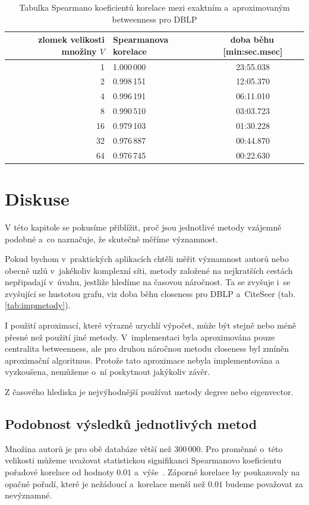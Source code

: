 \documentclass{bakalarka}
\begin{document}
\begin{table}[!ht]
\centering
\caption{Tabulka Spearmano koeficientů korelace mezi exaktním a~aproximovaným betweenness pro DBLP}
\label{tab:btwA}
\begin{tabular}{r|l|c}
\toprule
zlomek velikosti množiny $V$ & Spearmanova korelace & doba běhu\,[min:sec.msec] \\
\midrule
1  & 1.000\,000 & 23:55.038\\
2  & 0.998\,151 & 12:05.370\\
4  & 0.996\,191 & 06:11.010\\
8  & 0.990\,510 & 03:03.723\\
16 & 0.979\,103 & 01:30.228\\
32 & 0.976\,887 & 00:44.870\\
64 & 0.976\,745 & 00:22.630\\
\bottomrule
\end{tabular}
\end{table}

\chapter{Diskuse}
V této kapitole se pokusíme přiblížit, proč jsou jednotlivé metody vzájemně podobné a~co naznačuje, že skutečně měříme významnost.

Pokud bychom v~praktických aplikacích chtěli měřit významnost autorů nebo
obecně uzlů v~jakékoliv komplexní síti, metody založené na nejkratších cestách
nepřipadají v~úvahu, jestliže hledíme na časovou náročnost. Ta se zvyšuje i~se
zvyšující se hustotou grafu, viz doba běhu closeness pro DBLP a~CiteSeer (tab.
\ref{tab:impmetody}).

I použití aproximací, které výrazně urychlí výpočet, může být stejně nebo méně
přesné než použití jiné metody. V~implementaci byla aproximována pouze
centralita betweenness, ale pro druhou náročnou metodu closeness byl zmíněn
aproximační algoritmus. Protože tato aproximace nebyla implementována a
vyzkoušena, nemůžeme o~ní poskytnout jakýkoliv závěr.

Z časového hlediska je nejvýhodnější používat metody degree nebo eigenvector.

\section{Podobnost výsledků jednotlivých metod}
Množina autorů je pro obě databáze větší než 300\,000. Pro proměnné o~této
velikosti můžeme uvažovat statistickou signifikanci Spearmanovo koeficientu
pořadové korelace od hodnoty $0.01$ a~výše~\citep{yanding2009}.  Záporné
korelace by poukazovaly na opačné pořadí, které je nežádoucí a~korelace menší
než $0.01$ budeme považovat za nevýznamné.
\end{document}
